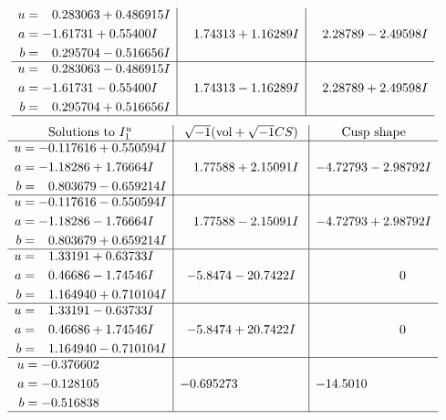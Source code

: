\documentclass[1p]{elsarticle_modified}
\theoremstyle{definition}
\newcommand{\I}{\sqrt{-1}}
\begin{document}
$$\begin{array}{c|c|c}
\begin{aligned}
u &= \phantom{-}0.283063 + 0.486915 I \\
a &= -1.61731 + 0.55400 I \\
b &= \phantom{-}0.295704 - 0.516656 I\end{aligned}
 & \phantom{-}1.74313 + 1.16289 I & \phantom{-}2.28789 - 2.49598 I \\ \hline\begin{aligned}
u &= \phantom{-}0.283063 - 0.486915 I \\
a &= -1.61731 - 0.55400 I \\
b &= \phantom{-}0.295704 + 0.516656 I\end{aligned}
 & \phantom{-}1.74313 - 1.16289 I & \phantom{-}2.28789 + 2.49598 I\\
 \hline 
 \end{array}$$\newpage$$\begin{array}{c|c|c}  
\text{Solutions to }I^u_{1}& \I (\text{vol} + \sqrt{-1}CS) & \text{Cusp shape}\\
 \hline 
\begin{aligned}
u &= -0.117616 + 0.550594 I \\
a &= -1.18286 + 1.76664 I \\
b &= \phantom{-}0.803679 - 0.659214 I\end{aligned}
 & \phantom{-}1.77588 + 2.15091 I & -4.72793 - 2.98792 I \\ \hline\begin{aligned}
u &= -0.117616 - 0.550594 I \\
a &= -1.18286 - 1.76664 I \\
b &= \phantom{-}0.803679 + 0.659214 I\end{aligned}
 & \phantom{-}1.77588 - 2.15091 I & -4.72793 + 2.98792 I \\ \hline\begin{aligned}
u &= \phantom{-}1.33191 + 0.63733 I \\
a &= \phantom{-}0.46686 - 1.74546 I \\
b &= \phantom{-}1.164940 + 0.710104 I\end{aligned}
 & -5.8474 - 20.7422 I & \phantom{-0.000000 } 0 \\ \hline\begin{aligned}
u &= \phantom{-}1.33191 - 0.63733 I \\
a &= \phantom{-}0.46686 + 1.74546 I \\
b &= \phantom{-}1.164940 - 0.710104 I\end{aligned}
 & -5.8474 + 20.7422 I & \phantom{-0.000000 } 0 \\ \hline\begin{aligned}
u &= -0.376602\phantom{ +0.000000I} \\
a &= -0.128105\phantom{ +0.000000I} \\
b &= -0.516838\phantom{ +0.000000I}\end{aligned}
 & -0.695273\phantom{ +0.000000I} & -14.5010\phantom{ +0.000000I}\\
 \hline 
 \end{array}$$\newpage\newpage\renewcommand{\arraystretch}{1}
\end{document}
